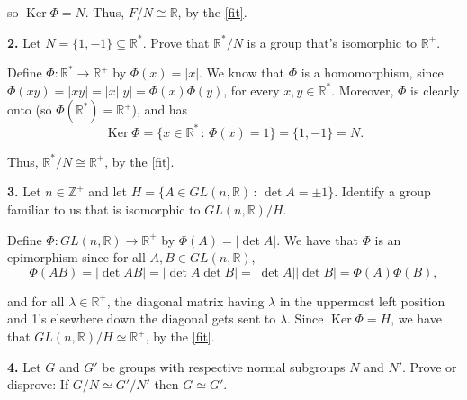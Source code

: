 \documentclass[10pt,]{book}
\theoremstyle{plain}
\theoremstyle{definition}
\theoremstyle{definition}
\theoremstyle{definition}
\theoremstyle{definition}
\numberwithin{equation}{section}
\def\Z{\mathbb{Z}}
\def\R{\mathbb{R}}
\DeclareMathOperator{\Ker}{Ker}
\begin{document}
      so \(\Ker
      \Phi=N\). Thus, \(F/N \cong \R\), by the \hyperref[fit]{\ref{fit}}.
\par\smallskip
\noindent\textbf{2.}\quad{}
        Let \(N=\{1,-1\}\subseteq \R^*\). Prove that \(\R^*/N\) is
        a group that's isomorphic to
        \(\R^+\).
\par\smallskip

      Define \(\Phi: \R^* \rightarrow \R^+\) by
      \(\Phi(x)=|x|\). We know that \(\Phi\) is a homomorphism, since
      \(\Phi(xy)=|xy|=|x||y|=\Phi(x)\Phi(y)\), for every \(x,y\in \R^*\).
      Moreover, \(\Phi\) is clearly onto (so \(\Phi(\R^*)=\R^+\)), and
      has
\begin{equation*}

        \Ker \Phi=\{x\in \R^*\,:\,\Phi(x)=1\}=\{1,-1\}=N.
      
\end{equation*}

\par

      Thus,
      \(\R^*/N \cong \R^+\), by the \hyperref[fit]{\ref{fit}}.
\par\smallskip
\noindent\textbf{3.}\quad{}
        Let \(n\in \Z^+\) and let \(H=\{A\in GL(n,\R)\,:\, \det A =\pm
        1\}\). Identify a group familiar to us that is isomorphic to
        \(GL(n,\R)/H\).
\par\smallskip

      Define \(\Phi:GL(n,\R)\to \R^+\) by
      \(\Phi(A)=|\det A|\). We have that \(\Phi\) is an epimorphism since for
      all \(A,B\in GL(n,\R)\),
\begin{equation*}

        \Phi(AB)=|\det AB|=|\det A \det B|=|\det
        A||\det B|=\Phi(A)\Phi(B),
      
\end{equation*}

      and for all \(\lambda \in \R^+\), the
      diagonal matrix having \(\lambda\) in the uppermost left position and
      1's elsewhere down the diagonal gets sent to \(\lambda\). Since \(\Ker
      \Phi=H\), we have that \(GL(n,\R)/H \simeq \R^+\), by the \hyperref[fit]{\ref{fit}}.
\par\smallskip
\noindent\textbf{4.}\quad{}
        Let \(G\) and \(G'\) be groups with respective normal subgroups
        \(N\) and \(N'\). Prove or disprove: If \(G/N\simeq G'/N'\) then \(G\simeq
        G'\).
\par\smallskip
\end{document}
